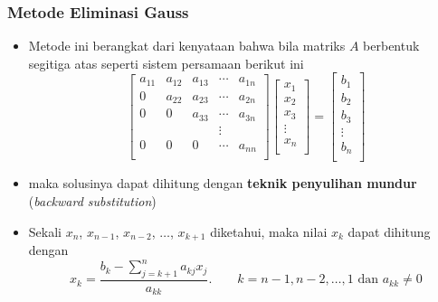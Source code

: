 \documentclass[pdflatex,compress,mathserif]{beamer}
\begin{document}
\begin{frame}
	\frametitle{Metode Eliminasi Gauss}
	\begin{itemize}
		\item Metode ini berangkat dari kenyataan bahwa bila matriks $ A $ berbentuk segitiga atas seperti sistem persamaan berikut ini
		\begin{equation*}
			\begin{bmatrix}
				a_{11} & a_{12} & a_{13} & \cdots & a_{1n}\\
				0 & a_{22} & a_{23} & \cdots & a_{2n}\\
				0 & 0 & a_{33} & \cdots & a_{3n}\\
				& & & \vdots & \\
				0 & 0 & 0 & \cdots & a_{nn}\\
			\end{bmatrix}
			\begin{bmatrix}
			x_1\\
			x_2\\
			x_3\\
			\vdots\\
			x_n\\
			\end{bmatrix}
			=
			\begin{bmatrix}
			b_1\\
			b_2\\
			b_3\\
			\vdots\\
			b_n\\
			\end{bmatrix}
		\end{equation*}
		\item maka solusinya dapat dihitung dengan \textbf{teknik penyulihan
		mundur} (\textit{backward substitution})
	\end{itemize}
\end{frame}

\begin{frame}
	\begin{itemize}
		\item Sekali $ x_n $, $ x_{n-1} $, $ x_{n-2} $, $\dots$, $ x_{k+1} $ diketahui, maka nilai $ x_k $ dapat dihitung dengan
		\[ x_k = \frac{b_k - \sum_{j=k+1}^{n}a_{kj}x_j}{a_{kk}}.\qquad k=n-1, n-2, \dots, 1 \text{ dan } a_{kk} \neq 0 \]
	\end{itemize}
\end{frame}
\end{document}
